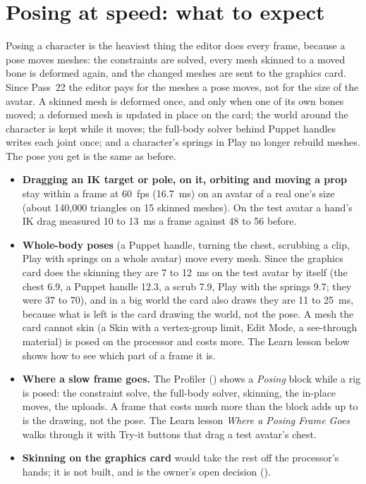 \section{Posing at speed: what to expect}
Posing a character is the heaviest thing the editor does every frame, because a pose moves meshes: the constraints are solved,
every mesh skinned to a moved bone is deformed again, and the changed meshes are sent to the graphics card. Since Pass~22
the editor pays for the meshes a pose moves, not for the size of the avatar. A skinned mesh is deformed once, and only when
one of its own bones moved; a deformed mesh is updated in place on the card; the world around the character is kept while it
moves; the full-body solver behind Puppet handles writes each joint once; and a character's springs in Play no longer
rebuild meshes. The pose you get is the same as before.
\begin{itemize}
  \item \textbf{Dragging an IK target or pole,  on it, orbiting and moving a prop} stay within a frame at 60~fps
    (16.7~ms) on an avatar of a real one's size (about 140{,}000 triangles on 15 skinned meshes). On the test avatar a
    hand's IK drag measured 10 to 13~ms a frame against 48 to 56 before.
  \item \textbf{Whole-body poses} (a Puppet handle, turning the chest, scrubbing a clip, Play with springs on a whole
    avatar) move every mesh. Since the graphics card does the skinning they are 7 to 12~ms on the test avatar by itself
    (the chest 6.9, a Puppet handle 12.3, a scrub 7.9, Play with the springs 9.7; they were 37 to 70), and in a big world the
    card also draws they are 11 to 25~ms, because what is left is the card drawing the world, not the pose. A mesh the card
    cannot skin (a Skin with a vertex-group limit, Edit Mode, a see-through material) is posed on the processor and costs
    more. The Learn lesson below shows how to see which part of a frame it is.
  \item \textbf{Where a slow frame goes.} The Profiler () shows a \emph{Posing} block while a rig is
    posed: the constraint solve, the full-body solver, skinning, the in-place moves, the uploads. A frame that costs much
    more than the block adds up to is the drawing, not the pose. The Learn lesson \emph{Where a Posing Frame Goes} walks
    through it with Try-it buttons that drag a test avatar's chest.
  \item \textbf{Skinning on the graphics card} would take the rest off the processor's hands; it is not built, and is
    the owner's open decision ().
\end{itemize}

